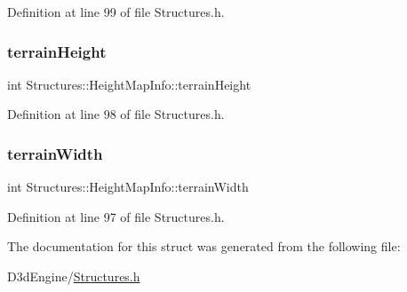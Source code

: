 Definition at line 99 of file Structures.\+h.

\mbox{\label{struct_structures_1_1_height_map_info_a32b0e9818a27f3486e082d010675029d}} 
\subsubsection{\texorpdfstring{terrain\+Height}{terrainHeight}}
{\footnotesize\ttfamily int Structures\+::\+Height\+Map\+Info\+::terrain\+Height}



Definition at line 98 of file Structures.\+h.

\mbox{\label{struct_structures_1_1_height_map_info_ae386b6bebf726c232565eecb66605fd1}} 
\subsubsection{\texorpdfstring{terrain\+Width}{terrainWidth}}
{\footnotesize\ttfamily int Structures\+::\+Height\+Map\+Info\+::terrain\+Width}



Definition at line 97 of file Structures.\+h.



The documentation for this struct was generated from the following file\+:\begin{DoxyCompactItemize}
\item 
D3d\+Engine/\mbox{\hyperlink{_structures_8h}{Structures.\+h}}\end{DoxyCompactItemize}

